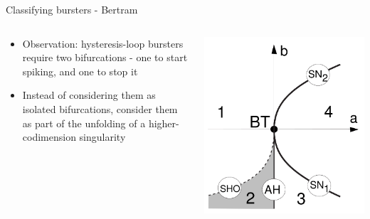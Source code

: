 \documentclass{beamer}
\begin{document}
\begin{frame}[label={sec:org4a30350}]{Classifying bursters - Bertram}
\begin{columns}
\begin{column}{0.5\columnwidth}
\begin{itemize}
\item Observation: hysteresis-loop bursters require two bifurcations - one to start spiking, and one to stop it
\item Instead of considering them as isolated bifurcations, consider them as part of the unfolding of a higher-codimension singularity
\end{itemize}
\end{column}

\begin{column}{0.5\columnwidth}
\begin{center}
\includegraphics[height=0.8\textheight]{bog.png}
\end{center}
\end{column}
\end{columns}
\end{frame}
\end{document}
